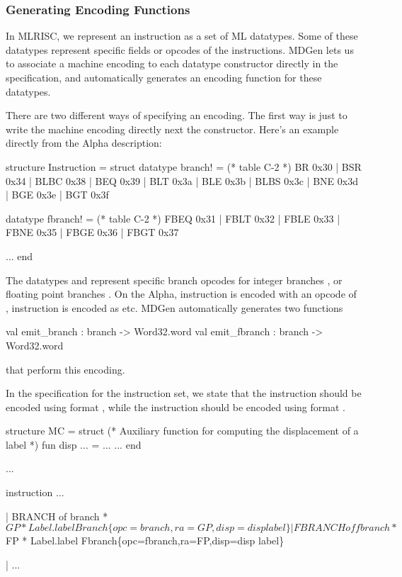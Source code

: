 \subsubsection{Generating Encoding Functions}

   In MLRISC, we represent an instruction as a set of ML datatypes.
Some of these datatypes represent specific fields or 
opcodes of the instructions.
MDGen lets us to associate a machine encoding to each datatype constructor
directly in the specification, and automatically generates an 
encoding function for these datatypes.

There are two different ways of specifying an encoding.  The first way
is just to write the machine encoding directly next the constructor.
Here's an example directly from the Alpha description:
\begin{SML}
   structure Instruction =
   struct
      datatype branch! =  (* table C-2 *)
         BR   0x30
                   | BSR 0x34
                              | BLBC 0x38
       | BEQ  0x39 | BLT 0x3a | BLE  0x3b
       | BLBS 0x3c | BNE 0x3d | BGE  0x3e
       | BGT  0x3f

      datatype fbranch! = (* table C-2 *)
                     FBEQ 0x31 | FBLT 0x32
       | FBLE 0x33             | FBNE 0x35
       | FBGE 0x36 | FBGT 0x37

      ...
   end
\end{SML}

The datatypes  and  represent specific
branch opcodes for integer branches , or floating point
branches .  On the Alpha, instruction  is encoded
with an opcode of , instruction  is encoded 
as  etc.  MDGen automatically generates two functions
\begin{SML}
    val emit_branch : branch -> Word32.word
    val emit_fbranch : branch -> Word32.word
\end{SML}
that perform this encoding.    

In the specification for the instruction set, we state that the
 instruction should be encoded using format ,
while the  instruction should be encoded using
format .
\begin{SML}
   structure MC =
   struct
      (* Auxiliary function for computing the displacement of a label *)
      fun disp ... = ...
      ...
   end

   ...

   instruction
     ...

   | BRANCH of branch * $GP * Label.label
     Branch\{opc=branch,ra=GP,disp=disp label\}

   | FBRANCH of fbranch * $FP * Label.label
     Fbranch\{opc=fbranch,ra=FP,disp=disp label\}

   | ...
\end{SML}

